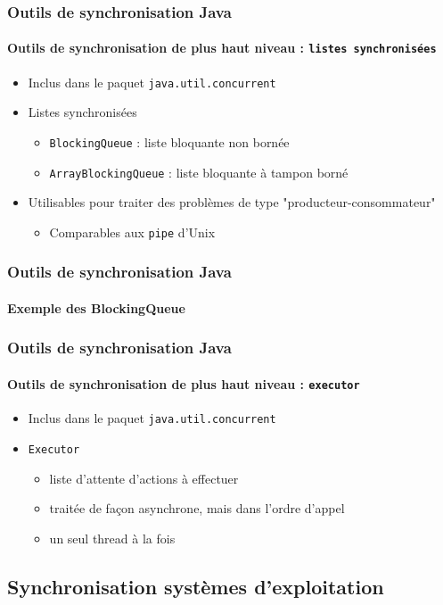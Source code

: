 \begin{frame}
\frametitle{Outils de synchronisation Java}
\framesubtitle{Outils de synchronisation de plus haut niveau : \texttt{listes synchronisées}}
\begin{itemize}
\item Inclus dans le paquet \texttt{java.util.concurrent}
\item Listes synchronisées
\begin{itemize}
\item \texttt{BlockingQueue} : liste bloquante non bornée
\item \texttt{ArrayBlockingQueue} : liste bloquante à tampon borné
\end{itemize}
\item Utilisables pour traiter des problèmes de type "producteur-consommateur"
\begin{itemize}
\item Comparables aux \texttt{pipe} d'Unix
\end{itemize}
\end{itemize}
\end{frame}

\begin{frame}
\frametitle{Outils de synchronisation Java}
\framesubtitle{Exemple des BlockingQueue}

\end{frame}

\begin{frame}
\frametitle{Outils de synchronisation Java}
\framesubtitle{Outils de synchronisation de plus haut niveau : \texttt{executor}}
\begin{itemize}
\item Inclus dans le paquet \texttt{java.util.concurrent}
\item \texttt{Executor}
\begin{itemize}
\item liste d'attente d'actions à effectuer
\item traitée de façon asynchrone, mais dans l'ordre d'appel
\item un seul thread à la fois
\end{itemize}
\begin{scriptsize}

\end{scriptsize}
\end{itemize}
\end{frame}


\subsection{Synchronisation systèmes d’exploitation}

